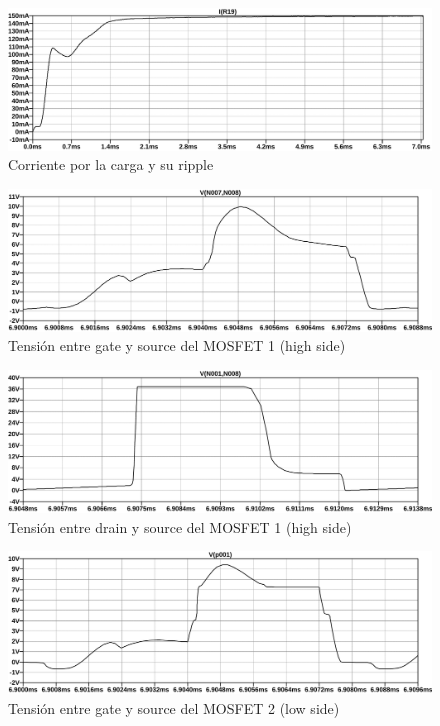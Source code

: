 \begin{figure}[ht]
    \centering
    \includegraphics[width=\textwidth]{images/sim/14.pdf}
    \caption{Corriente por la carga y su ripple}
    \label{fig:sim:14}
\end{figure}

\begin{figure}[ht]
    \centering
    \includegraphics[width=\textwidth]{images/sim/15.pdf}
    \caption{Tensión entre gate y source del MOSFET 1 (high side)}
    \label{fig:sim:15}
\end{figure}

\begin{figure}[ht]
    \centering
    \includegraphics[width=\textwidth]{images/sim/16.pdf}
    \caption{Tensión entre drain y source del MOSFET 1 (high side)}
    \label{fig:sim:16}
\end{figure}

\begin{figure}[ht]
    \centering
    \includegraphics[width=\textwidth]{images/sim/17.pdf}
    \caption{Tensión entre gate y source del MOSFET 2 (low side)}
    \label{fig:sim:17}
\end{figure}

